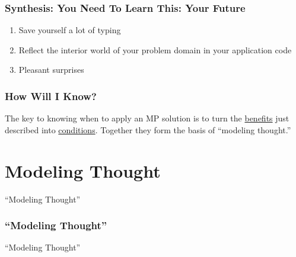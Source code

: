 \documentclass[slidestop,compress,mathserif]{beamer}
\begin{document}
\begin{frame}
	\frametitle{Synthesis:  You Need To Learn This:  Your Future}
	\begin{enumerate}
		\item Save yourself a lot of typing
		\pause
		\item Reflect the interior world of your problem domain in your application code
		\pause
		\item Pleasant surprises		
	\end{enumerate}
\end{frame}       

\begin{frame}
	\frametitle{How Will I Know?}
	The key to knowing when to apply an MP solution is to turn the
\underline{benefits} just described into \underline{conditions}. Together they
form the basis of ``modeling thought.''
\end{frame}

\section{Modeling Thought} %
\label{sec:modeling_thought}

\begin{frame}
	\begin{center}
		``Modeling Thought''
	\end{center}
\end{frame}

\begin{frame}
	\frametitle{``Modeling Thought''}
	\large
	\vskip 0.5cm
	\begin{center}
		``Modeling Thought''
	\end{center}
	
	\normalsize
\end{frame}
\end{document}
